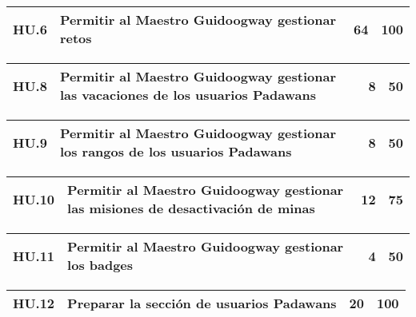 \begin{table}[h]
	\centering
	\begin{tabular}{| p{2.3cm} | p{5.1cm} | p{2cm} | p{1.6cm} |}
		\hline 
		HU.6 & Permitir al Maestro Guidoogway gestionar retos & 64 & 100 \\ \hline 
	\end{tabular}
\end{table}      

\begin{table}[h]
	\centering
	\begin{tabular}{| p{2.3cm} | p{5.1cm} | p{2cm} | p{1.6cm} |}
		\hline 
		HU.8 & Permitir al Maestro Guidoogway gestionar las vacaciones de los usuarios Padawans & 8 & 50 \\ \hline 
	\end{tabular}
\end{table}   


\begin{table}[h]
	\centering
	\begin{tabular}{| p{2.3cm} | p{5.1cm} | p{2cm} | p{1.6cm} |}
		\hline 
		HU.9 & Permitir al Maestro Guidoogway gestionar los rangos de los usuarios Padawans & 8 & 50 \\ \hline 
	\end{tabular}
\end{table}   

\begin{table}[h]
	\centering
	\begin{tabular}{| p{2.3cm} | p{5.1cm} | p{2cm} | p{1.6cm} |}
		\hline 
		HU.10 & Permitir al Maestro Guidoogway gestionar las misiones de desactivación de minas & 12 & 75 \\ \hline 
	\end{tabular}
\end{table}   


\begin{table}[h]
	\centering
	\begin{tabular}{| p{2.3cm} | p{5.1cm} | p{2cm} | p{1.6cm} |}
		\hline 
		HU.11 & Permitir al Maestro Guidoogway gestionar los badges & 4 & 50 \\ \hline 
	\end{tabular}
\end{table}   

\begin{table}[h]
	\centering
	\begin{tabular}{| p{2.3cm} | p{5.1cm} | p{2cm} | p{1.6cm} |}
		\hline 
		HU.12 & Preparar la sección de usuarios Padawans & 20 & 100 \\ \hline 
	\end{tabular}
\end{table}   

